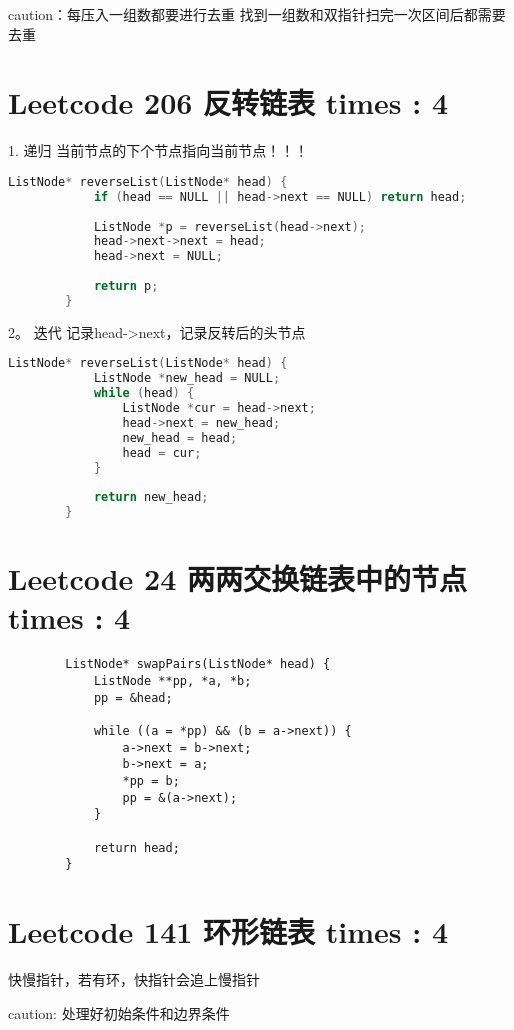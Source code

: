 \documentclass[UTF8]{ctexart}
\begin{document}
caution：每压入一组数都要进行去重
找到一组数和双指针扫完一次区间后都需要去重

\section{Leetcode 206 反转链表 times : 4}
1. 递归 当前节点的下个节点指向当前节点！！！
\begin{framed}
	\begin{lstlisting}[language=C++]
		ListNode* reverseList(ListNode* head) {
			if (head == NULL || head->next == NULL) return head;
	
			ListNode *p = reverseList(head->next);
			head->next->next = head;
			head->next = NULL;
	
			return p;
		}
	\end{lstlisting}
\end{framed}

2。 迭代 记录head->next，记录反转后的头节点
\begin{framed}
	\begin{lstlisting}[language=C++]
		ListNode* reverseList(ListNode* head) {
			ListNode *new_head = NULL;
			while (head) {
				ListNode *cur = head->next;
				head->next = new_head;
				new_head = head;
				head = cur;
			}
	
			return new_head;
		}
	\end{lstlisting}
\end{framed}

\section{Leetcode 24 两两交换链表中的节点 times : 4} 
\begin{framed}
	\begin{lstlisting}
		ListNode* swapPairs(ListNode* head) {
			ListNode **pp, *a, *b;
			pp = &head;

			while ((a = *pp) && (b = a->next)) {
				a->next = b->next;
				b->next = a;
				*pp = b;
				pp = &(a->next);
			}

			return head;
		}
	\end{lstlisting}
\end{framed}

\section{Leetcode 141 环形链表 times : 4}
快慢指针，若有环，快指针会追上慢指针

caution: 处理好初始条件和边界条件
\end{document}
